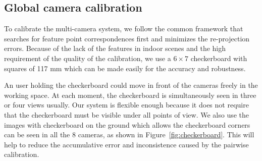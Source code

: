 
\subsection{Global camera calibration}
\label{sec:global-calib}


To calibrate the multi-camera system, we follow the common framework that searches for feature point correspondences first and minimizes the re-projection errors.
%
Because of the lack of the features in indoor scenes and the high requirement of the quality of the calibration, we use a $6\times7$ checkerboard with squares of 117 mm which can be made easily for the accuracy and robustness.

%
An user holding the checkerboard could move in front of the cameras freely in the working space.
At each moment, the checkerboard is simultaneously seen in three or four views usually.
%
Our system is flexible enough because it does not require that the checkerboard must be visible under all points of view.
%
We also use the images with checkerboard on the ground which allows the checkerboard corners can be seen in all the 8 cameras, as shown in Figure~\ref{fig:checkerboard}.
This will help to reduce the accumulative error and inconsistence caused by the pairwise calibration.
